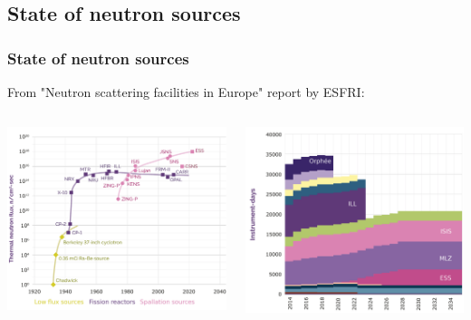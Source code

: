 \subsection{State of neutron sources}
\begin{frame}[t]
  \frametitle{State of neutron sources}
  From "Neutron scattering facilities in Europe" report by ESFRI:
  \begin{columns}
    \begin{column}{0.50\textwidth}
      \includegraphics[width=\textwidth]{01_Neutron/fig/fig000_NeutronSources_a2}
    \end{column}
    \begin{column}{0.50\textwidth}
      \includegraphics[width=\textwidth]{01_Neutron/fig/fig000_NeutronSources_b2}

\end{column}
\end{columns}
\end{frame}
